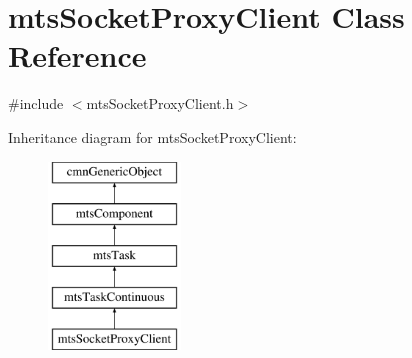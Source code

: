 \hypertarget{classmts_socket_proxy_client}{\section{mts\-Socket\-Proxy\-Client Class Reference}
\label{classmts_socket_proxy_client}
}


{\ttfamily \#include $<$mts\-Socket\-Proxy\-Client.\-h$>$}

Inheritance diagram for mts\-Socket\-Proxy\-Client\-:\begin{figure}[H]
\begin{center}
\leavevmode
\includegraphics[height=5.000000cm]{d4/d65/classmts_socket_proxy_client}
\end{center}
\end{figure}
